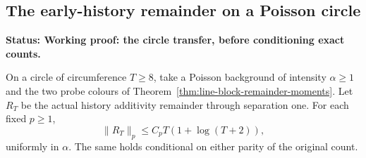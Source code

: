 \documentclass[11pt,letterpaper]{article}
\newcommand{\status}[1]{\textbf{Status: #1.}}
\begin{document}
\subsection{The early-history remainder on a Poisson circle}
\label{sec:circle-Poisson-remainder}

\status{Working proof: the circle transfer, before conditioning exact counts}

\begin{lemma}
\label{lem:circle-remainder-polynomial-moments}
On a circle of circumference $T\ge8$, take a Poisson background
of intensity $\alpha\ge1$ and the two probe colours of
Theorem~\ref{thm:line-block-remainder-moments}. Let $R_T$ be
the actual history additivity remainder through separation one.
For each fixed $p\ge1$,
\begin{equation}\label{eq:circle-remainder-polynomial-moments}
 \|R_T\|_p\le C_p T(1+\log(T+2)),
\end{equation}
uniformly in $\alpha$. The same holds conditional on either
parity of the original count.
\end{lemma}
\end{document}

